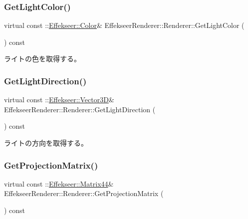 \subsubsection{\texorpdfstring{Get\+Light\+Color()}{GetLightColor()}}
{\footnotesize\ttfamily virtual const \+::\mbox{\hyperlink{struct_effekseer_1_1_color}{Effekseer\+::\+Color}}\& Effekseer\+Renderer\+::\+Renderer\+::\+Get\+Light\+Color (\begin{DoxyParamCaption}{ }\end{DoxyParamCaption}) const\hspace{0.3cm}{\ttfamily [pure virtual]}}



ライトの色を取得する。 

\mbox{\label{class_effekseer_renderer_1_1_renderer_a3da04ff6d2ad2a0126a7476703a7c019}} 
\subsubsection{\texorpdfstring{Get\+Light\+Direction()}{GetLightDirection()}}
{\footnotesize\ttfamily virtual const \+::\mbox{\hyperlink{struct_effekseer_1_1_vector3_d}{Effekseer\+::\+Vector3D}}\& Effekseer\+Renderer\+::\+Renderer\+::\+Get\+Light\+Direction (\begin{DoxyParamCaption}{ }\end{DoxyParamCaption}) const\hspace{0.3cm}{\ttfamily [pure virtual]}}



ライトの方向を取得する。 

\mbox{\label{class_effekseer_renderer_1_1_renderer_a7a94e69a46222064baf9394405a7c9a9}} 
\subsubsection{\texorpdfstring{Get\+Projection\+Matrix()}{GetProjectionMatrix()}}
{\footnotesize\ttfamily virtual const \+::\mbox{\hyperlink{struct_effekseer_1_1_matrix44}{Effekseer\+::\+Matrix44}}\& Effekseer\+Renderer\+::\+Renderer\+::\+Get\+Projection\+Matrix (\begin{DoxyParamCaption}{ }\end{DoxyParamCaption}) const\hspace{0.3cm}{\ttfamily [pure virtual]}}



